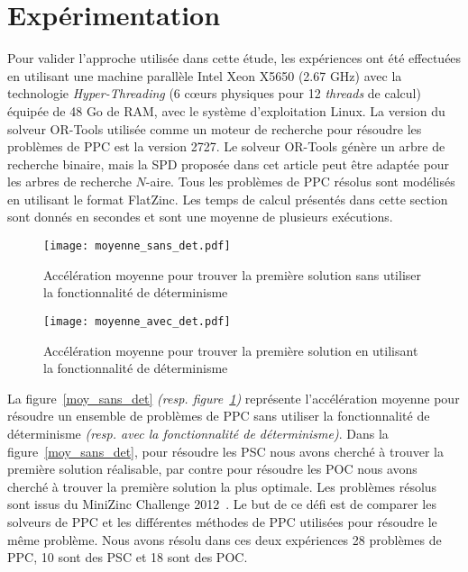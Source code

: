 \documentclass[parallelisme]{compas2014}
\begin{document}
\section{Expérimentation}\label{xp}
Pour valider l'approche utilisée dans cette étude, les expériences ont été effectuées en utilisant une machine parallèle Intel Xeon X5650 (2.67 GHz) avec la technologie \textit{Hyper-Threading} (6 cœurs physiques pour 12 \textit{threads} de calcul) équipée de 48 Go de RAM, avec le système d'exploitation Linux. La version du solveur OR-Tools utilisée comme un moteur de recherche pour résoudre les problèmes de PPC est la version 2727. Le solveur OR-Tools génère un arbre de recherche binaire, mais la SPD proposée dans cet article peut être adaptée pour les arbres de recherche $ N$-aire. Tous les problèmes de PPC résolus sont modélisés en utilisant le format FlatZinc. Les temps de calcul présentés dans cette section sont donnés en secondes et sont une moyenne de plusieurs exécutions.


\begin{figure}[htbp]
\begin{minipage}[c]{.45\linewidth}
\texttt{[image: moyenne\_sans\_det.pdf]}
\caption {Accélération moyenne pour trouver la première solution sans utiliser la fonctionnalité de déterminisme} \label{moy_sans_det}
\end{minipage}
\hfill
\begin{minipage}[c]{.45\linewidth}
\texttt{[image: moyenne\_avec\_det.pdf]}
\caption {Accélération moyenne pour trouver la première solution en utilisant la fonctionnalité de déterminisme} \label{moy_avec_det}
\end{minipage}
\end{figure}

La figure~\ref{moy_sans_det} \textit{(resp. figure~\ref{moy_avec_det})} représente l'accélération moyenne pour résoudre un ensemble de problèmes de PPC sans utiliser la fonctionnalité de déterminisme \textit{(resp. avec la fonctionnalité de déterminisme)}. Dans la figure~\ref{moy_sans_det}, pour résoudre les PSC nous avons cherché à trouver la première solution réalisable, par contre pour résoudre les POC nous avons cherché à trouver la première solution la plus optimale. Les problèmes résolus sont issus du MiniZinc Challenge 2012~\cite{ch2012}. Le but de ce défi est de comparer les solveurs de PPC et les différentes méthodes de PPC utilisées pour résoudre le même problème. Nous avons résolu dans ces deux expériences 28 problèmes de PPC, 10 sont des PSC et 18 sont des POC.
\end{document}
